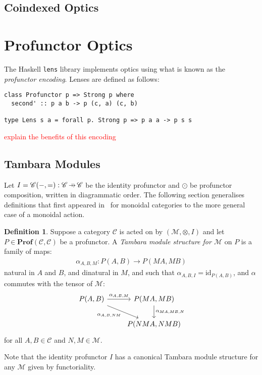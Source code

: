 \documentclass[11pt,letterpaper]{article}
\theoremstyle{plain}
\theoremstyle{definition}
\newtheorem{definition}[theorem]{Definition}
\newcommand{\C}{\mathscr{C}}
\newcommand{\M}{\mathscr{M}}
\newcommand{\lenslib}{\texttt{lens}}
\newcommand{\Prof}{\mathbf{Prof}}
\newcommand{\id}{\mathrm{id}}
\newcommand{\hto}{\ensuremath{\,\mathaccent\shortmid\rightarrow\,}}
\newcommand{\todo}[1]{\textcolor{red}{\small #1}}
\begin{document}
\subsection{Coindexed Optics}

\section{Profunctor Optics}\label{sec:profunctor-optics}
The Haskell \lenslib{} library implements optics using what is known as the \emph{profunctor encoding}. Lenses are defined as follows:

\begin{verbatim}
class Profunctor p => Strong p where
  second' :: p a b -> p (c, a) (c, b)

type Lens s a = forall p. Strong p => p a a -> p s s
\end{verbatim}

\todo{explain the benefits of this encoding}

\subsection{Tambara Modules}
Let $I = \C(-,{=}) : \C \hto \C$ be the identity profunctor and $\odot$ be profunctor composition, written in diagrammatic order. The following section generalises definitions that first appeared in~\cite[Section 3]{Doubles} for monoidal categories to the more general case of a monoidal action.

\begin{definition}
  Suppose a category $\C$ is acted on by $(\M, \otimes, I)$ and let $P \in \Prof(\C, \C)$ be a profunctor. A \emph{Tambara module structure for $\M$} on $P$ is a family of maps:
  \begin{align*}
    \alpha_{A,B,M} : P(A,B) \to P(MA, MB)
  \end{align*}
  natural in $A$ and $B$, and dinatural in $M$, and such that $\alpha_{A,B,I} = \id_{P(A,B)}$, and $\alpha$ commutes with the tensor of $\M$:
  \[
    \begin{tikzcd}
      P(A,B) \ar[r, "\alpha_{A,B,M}"] \ar[dr, "\alpha_{A, B, NM}" below left] & P(MA, MB) \ar[d, "\alpha_{MA, MB, N}" right] \\
      & P(NMA, NMB)
    \end{tikzcd}
  \]
  for all $A, B \in \C$ and $N, M \in \M$.
\end{definition}

Note that the identity profunctor $I$ has a canonical Tambara module structure for any $\M$ given by functoriality.
\end{document}
